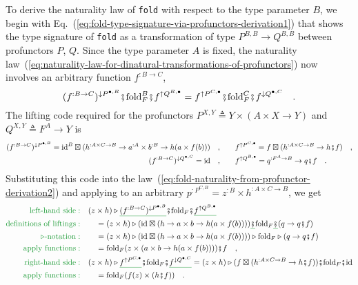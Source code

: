 To derive the naturality law of \lstinline!fold! with respect to
the type parameter $B$, we begin with Eq.~(\ref{eq:fold-type-signature-via-profunctors-derivation1})
that shows the type signature of \lstinline!fold! as a transformation
of type $P^{B,B}\rightarrow Q^{B,B}$ between profunctors $P$, $Q$.
Since the type parameter $A$ is fixed, the naturality law~(\ref{eq:naturality-law-for-dinatural-transformations-of-profunctors})
now involves an arbitrary function $f^{:B\rightarrow C}$,
\begin{equation}
(f^{:B\rightarrow C})^{\downarrow P^{\bullet,B}}\bef\text{fold}_{F}^{B}\bef f^{\uparrow Q^{B,\bullet}}=f^{\uparrow P^{C,\bullet}}\bef\text{fold}_{F}^{C}\bef f^{\downarrow Q^{\bullet,C}}\quad.\label{eq:fold-naturality-from-profunctor-derivation2}
\end{equation}
The lifting code required for the profunctors $P^{X,Y}\triangleq Y\times\left(A\times X\rightarrow Y\right)$
and $Q^{X,Y}\triangleq F^{A}\rightarrow Y$ is
\begin{align*}
(f^{:B\rightarrow C})^{\downarrow P^{\bullet,B}}=\text{id}^{B}\boxtimes(h^{:A\times C\rightarrow B}\rightarrow a^{:A}\times b^{:B}\rightarrow h(a\times f(b)))\quad, & \quad\quad f^{\uparrow P^{C,\bullet}}=f\boxtimes(h^{:A\times C\rightarrow B}\rightarrow h\bef f)\quad,\\
(f^{:B\rightarrow C})^{\downarrow Q^{\bullet,C}}=\text{id}\quad, & \quad\quad f^{\uparrow Q^{B,\bullet}}=q^{:F^{A}\rightarrow B}\rightarrow q\bef f\quad.
\end{align*}
Substituting this code into the law~(\ref{eq:fold-naturality-from-profunctor-derivation2})
and applying to an arbitrary $p^{:P^{C,B}}=z^{:B}\times h^{:A\times C\rightarrow B}$,
we get
\begin{align*}
{\color{greenunder}\text{left-hand side}:}\quad & (z\times h)\triangleright\gunderline{(f^{:B\rightarrow C})^{\downarrow P^{\bullet,B}}}\bef\text{fold}_{F}\bef\gunderline{f^{\uparrow Q^{B,\bullet}}}\\
{\color{greenunder}\text{definitions of liftings}:}\quad & \quad=(z\times h)\triangleright(\text{id}\boxtimes(h\rightarrow a\times b\rightarrow h(a\times f(b))))\gunderline{\bef}\text{fold}_{F}\gunderline{\bef}(q\rightarrow q\bef f)\\
{\color{greenunder}\triangleright\text{-notation}:}\quad & \quad=(z\times h)\triangleright(\text{id}\boxtimes(h\rightarrow a\times b\rightarrow h(a\times f(b))))\triangleright\text{fold}_{F}\triangleright(q\rightarrow q\bef f)\\
{\color{greenunder}\text{apply functions}:}\quad & \quad=\text{fold}_{F}(z\times(a\times b\rightarrow h(a\times f(b))))\bef f\quad,\\
{\color{greenunder}\text{right-hand side}:}\quad & (z\times h)\triangleright\gunderline{f^{\uparrow P^{C,\bullet}}}\bef\text{fold}_{F}\bef\gunderline{f^{\downarrow Q^{\bullet,C}}}=(z\times h)\triangleright(f\boxtimes(h^{:A\times C\rightarrow B}\rightarrow h\bef f))\bef\text{fold}_{F}\bef\text{id}\\
{\color{greenunder}\text{apply functions}:}\quad & \quad=\text{fold}_{F}(f(z)\times(h\bef f))\quad.
\end{align*}
